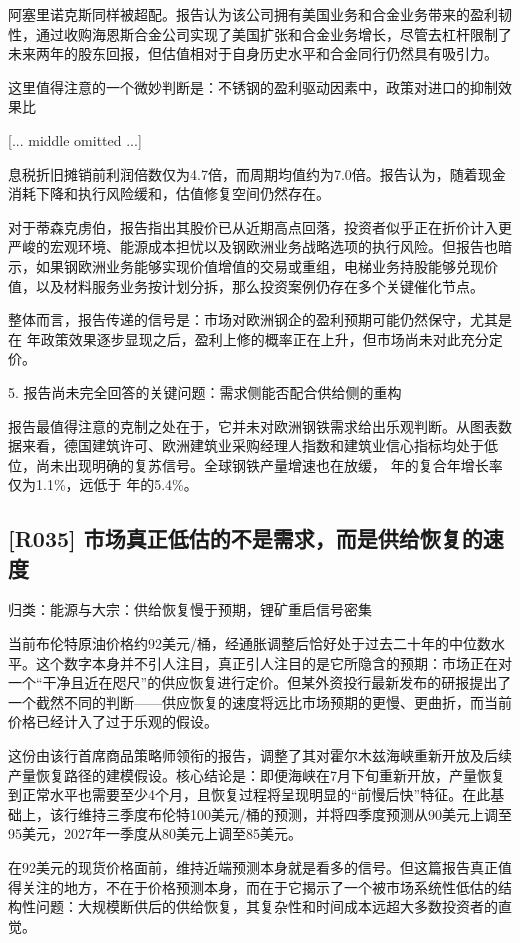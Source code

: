 \documentclass[11pt]{ctexart}
\begin{document}
阿塞里诺克斯同样被超配。报告认为该公司拥有美国业务和合金业务带来的盈利韧性，通过收购海恩斯合金公司实现了美国扩张和合金业务增长，尽管去杠杆限制了未来两年的股东回报，但估值相对于自身历史水平和合金同行仍然具有吸引力。

这里值得注意的一个微妙判断是：不锈钢的盈利驱动因素中，政策对进口的抑制效果比

[... middle omitted ...]

息税折旧摊销前利润倍数仅为4.7倍，而周期均值约为7.0倍。报告认为，随着现金消耗下降和执行风险缓和，估值修复空间仍然存在。

对于蒂森克虏伯，报告指出其股价已从近期高点回落，投资者似乎正在折价计入更严峻的宏观环境、能源成本担忧以及钢欧洲业务战略选项的执行风险。但报告也暗示，如果钢欧洲业务能够实现价值增值的交易或重组，电梯业务持股能够兑现价值，以及材料服务业务按计划分拆，那么投资案例仍存在多个关键催化节点。

整体而言，报告传递的信号是：市场对欧洲钢企的盈利预期可能仍然保守，尤其是在 年政策效果逐步显现之后，盈利上修的概率正在上升，但市场尚未对此充分定价。

5. 报告尚未完全回答的关键问题：需求侧能否配合供给侧的重构

报告最值得注意的克制之处在于，它并未对欧洲钢铁需求给出乐观判断。从图表数据来看，德国建筑许可、欧洲建筑业采购经理人指数和建筑业信心指标均处于低位，尚未出现明确的复苏信号。全球钢铁产量增速也在放缓， 年的复合年增长率仅为1.1\%，远低于 年的5.4\%。

\subsection{[R035] 市场真正低估的不是需求，而是供给恢复的速度}
{\small\color{refgray}归类：能源与大宗：供给恢复慢于预期，锂矿重启信号密集}

当前布伦特原油价格约92美元/桶，经通胀调整后恰好处于过去二十年的中位数水平。这个数字本身并不引人注目，真正引人注目的是它所隐含的预期：市场正在对一个“干净且近在咫尺”的供应恢复进行定价。但某外资投行最新发布的研报提出了一个截然不同的判断——供应恢复的速度将远比市场预期的更慢、更曲折，而当前价格已经计入了过于乐观的假设。

这份由该行首席商品策略师领衔的报告，调整了其对霍尔木兹海峡重新开放及后续产量恢复路径的建模假设。核心结论是：即便海峡在7月下旬重新开放，产量恢复到正常水平也需要至少4个月，且恢复过程将呈现明显的“前慢后快”特征。在此基础上，该行维持三季度布伦特100美元/桶的预测，并将四季度预测从90美元上调至95美元，2027年一季度从80美元上调至85美元。

在92美元的现货价格面前，维持近端预测本身就是看多的信号。但这篇报告真正值得关注的地方，不在于价格预测本身，而在于它揭示了一个被市场系统性低估的结构性问题：大规模断供后的供给恢复，其复杂性和时间成本远超大多数投资者的直觉。
\end{document}
